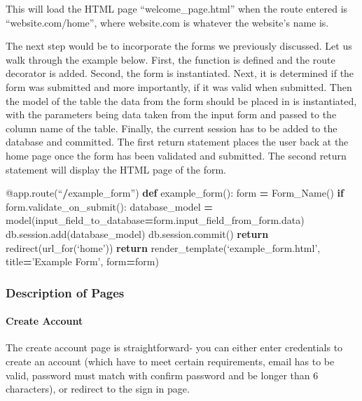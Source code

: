 \documentclass[]{book}
\newenvironment{Shaded}{\begin{snugshade}}{\end{snugshade}}
\newcommand{\AttributeTok}[1]{\textcolor[rgb]{0.77,0.63,0.00}{#1}}
\newcommand{\ControlFlowTok}[1]{\textcolor[rgb]{0.13,0.29,0.53}{\textbf{#1}}}
\newcommand{\KeywordTok}[1]{\textcolor[rgb]{0.13,0.29,0.53}{\textbf{#1}}}
\newcommand{\NormalTok}[1]{#1}
\newcommand{\OperatorTok}[1]{\textcolor[rgb]{0.81,0.36,0.00}{\textbf{#1}}}
\let\oldparagraph\paragraph
\renewcommand{\paragraph}[1]{\oldparagraph{#1}\mbox{}}
\begin{document}
This will load the HTML page ``welcome\_page.html'' when the route entered is ``website.com/home'', where website.com is whatever the website's name is.

The next step would be to incorporate the forms we previously discussed. Let us walk through the example below. First, the function is defined and the route decorator is added. Second, the form is instantiated. Next, it is determined if the form was submitted and more importantly, if it was valid when submitted. Then the model of the table the data from the form should be placed in is instantiated, with the parameters being data taken from the input form and passed to the column name of the table. Finally, the current session has to be added to the database and committed. The first return statement places the user back at the home page once the form has been validated and submitted. The second return statement will display the HTML page of the form.

\begin{Shaded}
\begin{Highlighting}[]
\AttributeTok{@app.route}\NormalTok{(“}\OperatorTok{/}\NormalTok{example_form”)}
\KeywordTok{def}\NormalTok{ example_form():}
\NormalTok{form }\OperatorTok{=}\NormalTok{ Form_Name()}
\ControlFlowTok{if}\NormalTok{ form.validate_on_submit():}
\NormalTok{              database_model }\OperatorTok{=}\NormalTok{ model(input_field_to_database}\OperatorTok{=}\NormalTok{form.input_field_from_form.data)}
\NormalTok{              db.session.add(database_model)}
\NormalTok{              db.session.commit()}
              \ControlFlowTok{return}\NormalTok{ redirect(url_for(‘home’))}
\ControlFlowTok{return}\NormalTok{ render_template(‘example_form.html’, title}\OperatorTok{=}\NormalTok{’Example Form’, form}\OperatorTok{=}\NormalTok{form)}
\end{Highlighting}
\end{Shaded}

\hypertarget{description-of-pages}{%
\subsubsection{Description of Pages}\label{description-of-pages}}

\hypertarget{create-account}{%
\paragraph{Create Account}\label{create-account}}

The create account page is straightforward- you can either enter credentials to create an account (which have to meet certain requirements, email has to be valid, password must match with confirm password and be longer than 6 characters), or redirect to the sign in page.
\end{document}
